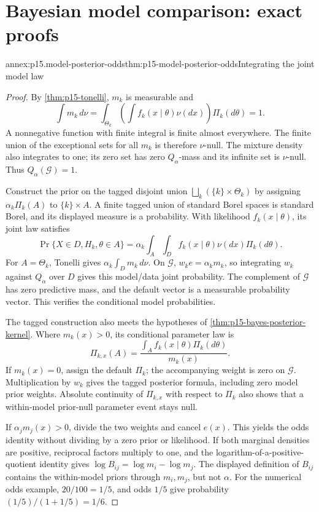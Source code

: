 \section{Bayesian model comparison: exact proofs}
\label{sec:annex-p15-bayesian-model-comparison}

\begin{annexitem}{annex:p15.model-posterior-odds}{thm:p15-model-posterior-odds}{Integrating the joint model law}
\begin{proof}
By \cref{thm:p15-tonelli}, \(m_k\) is measurable and
\[
 \int m_k\,d\nu=\int_{\Theta_k}\left(\int f_k(x\mid\theta)\nu(dx)\right)
                  \Pi_k(d\theta)=1.
\]
A nonnegative function with finite integral is finite almost everywhere.
The finite union of the exceptional sets for all \(m_k\) is therefore
\(\nu\)-null. The mixture density also integrates to one; its zero set
has zero \(Q_\alpha\)-mass and its infinite set is \(\nu\)-null.
Thus \(Q_\alpha(\mathcal G)=1\).

Construct the prior on the tagged disjoint union
\(\bigsqcup_k(\{k\}\times\Theta_k)\) by assigning
\(\alpha_k\Pi_k(A)\) to \(\{k\}\times A\). A finite tagged union of
standard Borel spaces is standard Borel, and its displayed measure is a
probability. With likelihood \(f_k(x\mid\theta)\), its joint law satisfies
\[
 \Pr\{X\in D,H_k,\theta\in A\}
 =\alpha_k\int_A\int_D f_k(x\mid\theta)\nu(dx)\Pi_k(d\theta).
\]
For \(A=\Theta_k\), Tonelli gives \(\alpha_k\int_Dm_k\,d\nu\).
On \(\mathcal G\), \(w_ke=\alpha_km_k\), so integrating \(w_k\)
against \(Q_\alpha\) over \(D\) gives this model/data joint probability.
The complement of \(\mathcal G\) has zero predictive mass, and the
default vector is a measurable probability vector. This verifies the
conditional model probabilities.

The tagged construction also meets the hypotheses of
\cref{thm:p15-bayes-posterior-kernel}. Where \(m_k(x)>0\), its
conditional parameter law is
\[
 \Pi_{k,x}(A)=\frac{\int_A f_k(x\mid\theta)\Pi_k(d\theta)}{m_k(x)}.
\]
If \(m_k(x)=0\), assign the default \(\Pi_k\); the accompanying
weight is zero on \(\mathcal G\). Multiplication by \(w_k\) gives the
tagged posterior formula, including zero model prior weights. Absolute
continuity of \(\Pi_{k,x}\) with respect to \(\Pi_k\) also shows that
a within-model prior-null parameter event stays null.

If \(\alpha_jm_j(x)>0\), divide the two weights and cancel \(e(x)\).
This yields the odds identity without dividing by a zero prior or likelihood.
If both marginal densities are positive, reciprocal factors multiply to
one, and the logarithm-of-a-positive-quotient identity gives
\(\log B_{ij}=\log m_i-\log m_j\).
The displayed definition of \(B_{ij}\) contains the within-model
priors through \(m_i,m_j\), but not \(\alpha\). For the numerical odds
example, \(20/100=1/5\), and odds \(1/5\) give probability
\((1/5)/(1+1/5)=1/6\).
\end{proof}
\end{annexitem}


